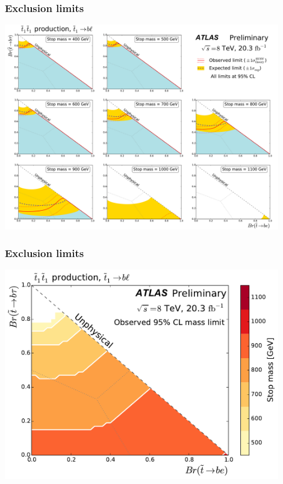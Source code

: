 \documentclass[10pt, svgnames]{beamer}
\begin{document}
\begin{frame}
  \frametitle{Exclusion limits}
  \begin{center}
    \includegraphics[width=0.9\textwidth]{figures/blstop/limit_contours.pdf}
  \end{center}
\end{frame}


\begin{frame}
  \frametitle{Exclusion limits}
  \begin{center}
    \includegraphics[width=0.9\textwidth]
    {figures/blstop/mass_limit_contours_no_extras_obs.pdf}
  \end{center}
\end{frame}
\end{document}
